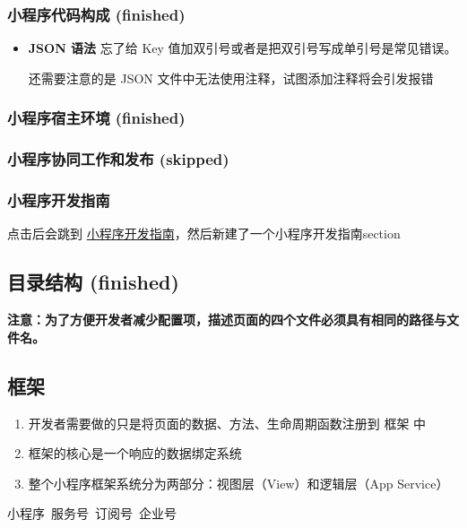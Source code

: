 \documentclass[a4paper, 12pt]{article}
\begin{document}
\subsubsection{小程序代码构成 (finished)}
\begin{itemize}
\item \textbf{JSON 语法} 忘了给 Key 值加双引号或者是把双引号写成单引号是常见错误。

还需要注意的是 JSON 文件中无法使用注释，试图添加注释将会引发报错

\end{itemize}

\subsubsection{小程序宿主环境 (finished)}
\subsubsection{小程序协同工作和发布 (skipped)}

\subsubsection{小程序开发指南}
点击后会跳到 \href{https://developers.weixin.qq.com/ebook?action=get_post_info&docid=0008aeea9a8978ab0086a685851c0a}{小程序开发指南}，然后新建了一个小程序开发指南section

\subsection{目录结构 (finished)}
\textbf{注意：为了方便开发者减少配置项，描述页面的四个文件必须具有相同的路径与文件名。}

\subsection{框架}
\begin{enumerate}

\item 开发者需要做的只是将页面的数据、方法、生命周期函数注册到 框架 中

\item 框架的核心是一个响应的数据绑定系统
\item 整个小程序框架系统分为两部分：视图层（View）和逻辑层（App Service）
\end{enumerate}

\vspace{2in}
小程序~服务号~订阅号~企业号
\end{document}
